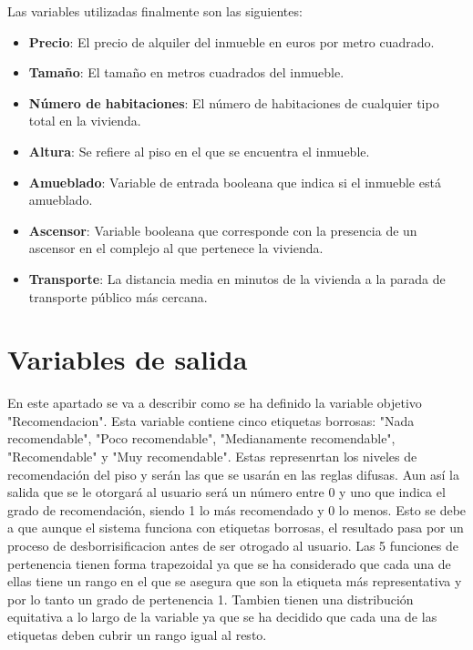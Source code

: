 \documentclass[12pt]{report} %
\begin{document}
        Las variables utilizadas finalmente son las siguientes: 
        \begin{itemize}
            \item \textbf{Precio}: El precio de alquiler del inmueble en euros por metro cuadrado.

            \item \textbf{Tamaño}: El tamaño en metros cuadrados del inmueble. 
            
            \item \textbf{Número de habitaciones}: El número de habitaciones de cualquier tipo total en la vivienda. 

            \item \textbf{Altura}: Se refiere al piso en el que se encuentra el inmueble.
            
            \item \textbf{Amueblado}: Variable de entrada booleana que indica si el inmueble está amueblado.
            
            \item \textbf{Ascensor}: Variable booleana que corresponde con la presencia de un ascensor en el complejo al que pertenece la vivienda. 

            \item \textbf{Transporte}: La distancia media en minutos de la vivienda a la parada de transporte público más cercana.
        \end{itemize}

    \section{Variables de salida}
    En este apartado se va a describir como se ha definido la variable objetivo "Recomendacion". Esta variable contiene cinco etiquetas borrosas: 
    "Nada recomendable", "Poco recomendable", "Medianamente recomendable", "Recomendable" y "Muy recomendable". Estas represenrtan los niveles de 
    recomendación del piso y serán las que se usarán en las reglas difusas. Aun así la salida que se le otorgará al usuario será un número entre 
    0 y uno que indica el grado de recomendación, siendo 1 lo más recomendado y 0 lo menos. Esto se debe a que aunque el sistema funciona con 
    etiquetas borrosas, el resultado pasa por un proceso de desborrisificacion antes de ser otrogado al usuario. Las 5 funciones de pertenencia 
    tienen forma trapezoidal ya que se ha considerado que cada una de ellas tiene un rango en el que se asegura que son la etiqueta más 
    representativa y por lo tanto un grado de pertenencia 1. Tambien tienen una distribución equitativa a lo largo de la variable ya que se ha 
    decidido que cada una de las etiquetas deben cubrir un rango igual al resto.
\end{document}
